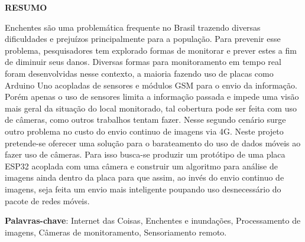 \documentclass[12pt]{article}
\begin{document}
\newpage
\begin{center}
{\large \bf RESUMO}\\
\end{center}
\vspace{1.0 pt}
\begin{spacing}{1.0}





\thispagestyle{empty}

\noindent Enchentes são uma problemática frequente no Brasil trazendo diversas dificuldades e prejuízos principalmente para a população. Para prevenir esse problema, pesquisadores tem explorado formas de monitorar e prever estes a fim de diminuir seus danos. Diversas formas para monitoramento em tempo real foram desenvolvidas nesse contexto, a maioria fazendo uso de placas como Arduino Uno acopladas de sensores e módulos GSM para o envio da informação. Porém apenas o uso de sensores limita a informação passada e impede uma visão mais geral da situação do local monitorado, tal cobertura pode ser feita com uso de câmeras, como outros trabalhos tentam fazer. Nesse segundo cenário surge outro problema no custo do envio continuo de imagens via 4G. Neste projeto pretende-se oferecer uma solução para o barateamento do uso de dados móveis ao fazer uso de câmeras. Para isso busca-se produzir um protótipo de uma placa ESP32 acoplada com uma câmera e construir um algoritmo para análise de imagens ainda dentro da placa para que assim, ao invés do envio continuo de imagens, seja feita um envio mais inteligente poupando uso desnecessário do pacote de redes móveis.

\end{spacing}
\begin{spacing}{1.5}
\textbf {Palavras-chave}: Internet das Coisas, Enchentes e inundações, Processamento de imagens, Câmeras de monitoramento, Sensoriamento remoto.
\end{spacing}
\end{document}

